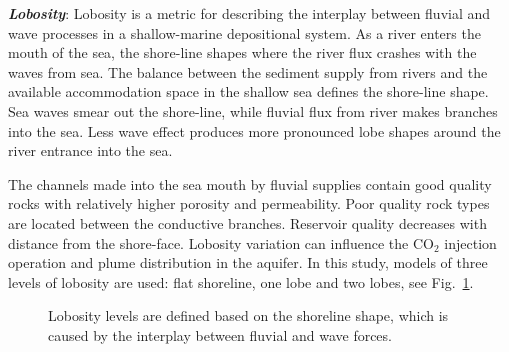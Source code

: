 \textbf{\textit{Lobosity}}: Lobosity is a metric for describing the interplay
between fluvial and wave processes in a shallow-marine depositional system. As a river enters the mouth of the sea, the shore-line shapes where the river
flux crashes with the waves from sea. The balance between the sediment supply from
rivers and the available accommodation space in the shallow sea defines the
shore-line shape. Sea waves smear out the shore-line, while fluvial flux from
river makes branches into the sea. Less wave effect produces more pronounced
lobe shapes around the river entrance into the sea. 

The channels made into the sea mouth by fluvial supplies contain good quality
rocks with relatively higher porosity and permeability. Poor quality rock
types are located between the conductive branches. Reservoir quality decreases
with distance from the shore-face. Lobosity variation can influence the CO$_2$
injection operation and plume distribution in the aquifer. In this study, models
of three levels of lobosity are used: flat shoreline, one lobe and two lobes,
see Fig.~\ref{fig:lobCauses}.

 
\begin{figure}[tbp]%
  
   \hspace{0.5cm}
  \hspace{0.5cm}

  \caption{Lobosity levels are defined based on the shoreline shape, which is
caused by the interplay between fluvial and wave forces.}
 \label{fig:lobCauses}
\end{figure}

